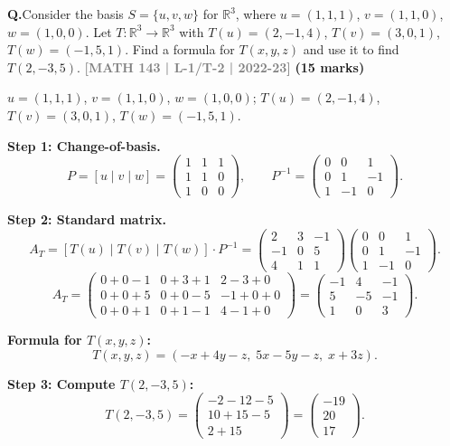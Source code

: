 \documentclass[12pt,a3paper]{article}
\newcommand{\yr}[1]{\hfill\textcolor{gray}{\small\textbf{[#1]}}}
\newcommand{\mk}[1]{\textcolor{orange!70!black}{\small\textbf{(#1 marks)}}}
\newcounter{qnum}
\newcommand{\Q}[1]{%
  \needspace{4\baselineskip}
  \refstepcounter{qnum}
  \vspace{6pt}
  \noindent\textbf{Q\theqnum.}\enspace #1\par
}
\begin{document}
\Q{Consider the basis $S = \{u,v,w\}$ for $\mathbb{R}^3$, where $u = (1,1,1)$, $v = (1,1,0)$, $w = (1,0,0)$. Let $T: \mathbb{R}^3 \to \mathbb{R}^3$ with $T(u) = (2,-1,4)$, $T(v) = (3,0,1)$, $T(w) = (-1,5,1)$. Find a formula for $T(x,y,z)$ and use it to find $T(2,-3,5)$.
\yr{MATH 143 | L-1/T-2 | 2022-23} \mk{15}}


\begin{tcolorbox}[enhanced,breakable,
  colback=cF!4,colframe=cF,boxrule=0.8pt,arc=5pt,
  title={\textbf{Answer --- $T:\mathbb{R}^3\to\mathbb{R}^3$ from Basis Values; $T(2,-3,5)$}},
  fonttitle=\bfseries\color{white},colbacktitle=cF]

$u=(1,1,1)$, $v=(1,1,0)$, $w=(1,0,0)$; $T(u)=(2,-1,4)$, $T(v)=(3,0,1)$, $T(w)=(-1,5,1)$.

\textbf{Step 1: Change-of-basis.}
\[
P=[u\mid v\mid w]=\begin{pmatrix}1&1&1\\1&1&0\\1&0&0\end{pmatrix},\qquad
P^{-1}=\begin{pmatrix}0&0&1\\0&1&-1\\1&-1&0\end{pmatrix}.
\]

\textbf{Step 2: Standard matrix.}
\[
A_T=[T(u)\mid T(v)\mid T(w)]\cdot P^{-1}=\begin{pmatrix}2&3&-1\\-1&0&5\\4&1&1\end{pmatrix}\begin{pmatrix}0&0&1\\0&1&-1\\1&-1&0\end{pmatrix}.
\]
\[
A_T=\begin{pmatrix}0+0-1&0+3+1&2-3+0\\0+0+5&0+0-5&-1+0+0\\0+0+1&0+1-1&4-1+0\end{pmatrix}=\begin{pmatrix}-1&4&-1\\5&-5&-1\\1&0&3\end{pmatrix}.
\]

\textbf{Formula for $T(x,y,z)$:}
\[
T(x,y,z)=(-x+4y-z,\;5x-5y-z,\;x+3z).
\]

\textbf{Step 3: Compute $T(2,-3,5)$:}
\[
T(2,-3,5)=\begin{pmatrix}-2-12-5\\10+15-5\\2+15\end{pmatrix}=\boxed{\begin{pmatrix}-19\\20\\17\end{pmatrix}}.
\]

\end{tcolorbox}
\end{document}

